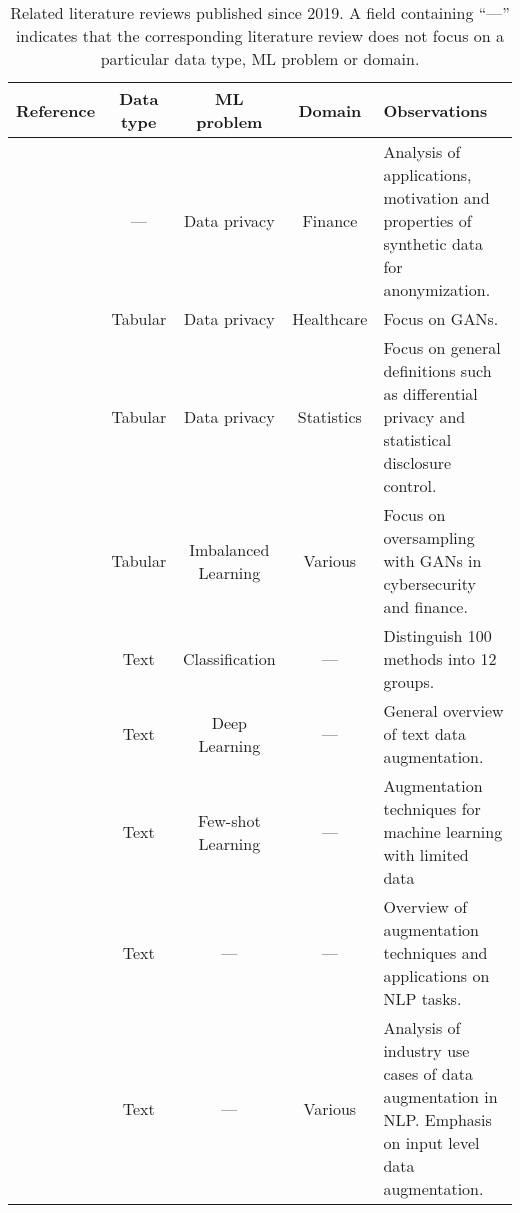 \begingroup\small
\setlength\LTleft{-1.5cm}
\setlength\LTright{1.5cm}
\begin{table}[t!]
    \centering
    \caption[Related literature reviews published since 2019.]{\label{tab:literature-reviews}
        Related literature reviews published since 2019. A field containing
        ``---'' indicates that the corresponding literature review does not
        focus on a particular data type, ML problem or domain.
    }
    \begin{tabularx}{\textwidth}{@{}rcccX@{}}
        \toprule
        Reference & Data type & ML problem & Domain & Observations \\
        \midrule

        \cite{assefa2020generating} & --- & Data privacy &
        Finance & Analysis of applications, motivation and properties of
        synthetic data for anonymization. \\

        \cite{hernandez2022synthetic} & Tabular & Data privacy &
        Healthcare & Focus on GANs. \\

        \cite{raghunathan2021synthetic} & Tabular & Data privacy &
        Statistics & Focus on general definitions such as differential privacy
        and statistical disclosure control.\\

        \cite{sauber2022use} & Tabular & Imbalanced Learning &
        Various & Focus on oversampling with GANs in cybersecurity
        and finance.\\

        \cite{bayer2021survey} & Text & Classification & --- & Distinguish
        100 methods into 12 groups. \\

        \cite{shorten2021text} & Text & Deep Learning & --- & General
        overview of text data augmentation. \\

        \cite{chen2021empirical} & Text & Few-shot Learning & --- &
        Augmentation techniques for machine learning with limited data\\

        \cite{feng2021survey} & Text & --- & --- & Overview of augmentation
        techniques and applications on NLP tasks.\\

        \cite{liu2020survey} & Text & --- & Various & Analysis of industry
        use cases of data augmentation in NLP\@. Emphasis on input level data
        augmentation.\\


\end{tabularx}
\end{table}
